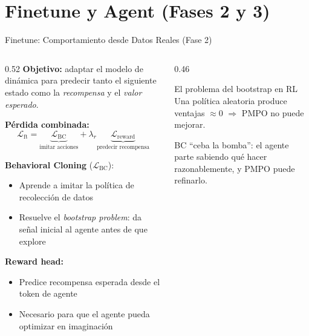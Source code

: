 \documentclass[aspectratio=169, 12pt]{beamer}
\begin{document}
\section{Finetune y Agent (Fases 2 y 3)}

\begin{frame}{Finetune: Comportamiento desde Datos Reales (Fase 2)}
\begin{columns}[T]
  \begin{column}{0.52\textwidth}
    \textbf{Objetivo:} adaptar el modelo de dinámica para predecir tanto el siguiente estado como la \emph{recompensa} y el \emph{valor esperado}.

    \vspace{8pt}
    \textbf{Pérdida combinada:}
    \[
      \mathcal{L}_\text{ft} = \underbrace{\mathcal{L}_\text{BC}}_{\text{imitar acciones}} + \lambda_r\underbrace{\mathcal{L}_\text{reward}}_{\text{predecir recompensa}}
    \]

    \vspace{4pt}
    \textbf{Behavioral Cloning} ($\mathcal{L}_\text{BC}$):
    \begin{itemize}\small
      \item Aprende a imitar la política de recolección de datos
      \item Resuelve el \emph{bootstrap problem}: da señal inicial al agente antes de que explore
    \end{itemize}

    \vspace{4pt}
    \textbf{Reward head:}
    \begin{itemize}\small
      \item Predice recompensa esperada desde el token de agente
      \item Necesario para que el agente pueda optimizar en imaginación
    \end{itemize}
  \end{column}
  \begin{column}{0.46\textwidth}
    \begin{alertblock}{El problema del bootstrap en RL}
      Una política aleatoria produce ventajas $\approx 0$ $\Rightarrow$ PMPO no puede mejorar.

      \vspace{4pt}
      BC ``ceba la bomba'': el agente parte sabiendo qué hacer razonablemente, y PMPO puede refinarlo.
    \end{alertblock}


\end{column}
\end{columns}
\end{frame}
\end{document}
